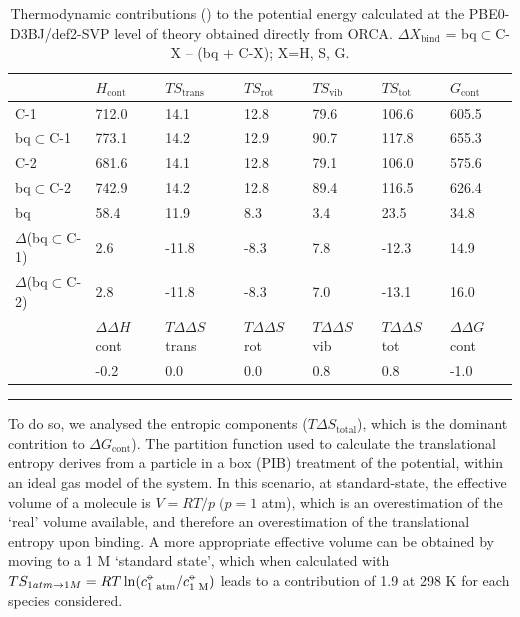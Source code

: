 \documentclass[../../main.tex]{subfiles}
\begin{document}
\begin{table}[h]
	\def\arraystretch{1.7}
	\begin{tabularx}{\textwidth}{YYYYYYY}
		\hline
		&$H_\text{cont}$&	$TS_\text{trans}$	&$TS_\text{rot}	$&$TS_\text{vib}$&	$TS_\text{tot}$&$G_\text{cont}$ 
\\
		\hline
		
		C-1	&712.0	&14.1&	12.8&	79.6&	106.6&	605.5
\\
		bq$\subset$C-1	&773.1&	14.2&	12.9&	90.7	&117.8&	655.3
\\
		C-2	&681.6	&14.1	&12.8&	79.1&	106.0&	575.6
\\
		bq$\subset$C-2	&742.9&	14.2&	12.8&	89.4&	116.5&	626.4
\\
		bq&	58.4&	11.9&	8.3	&3.4&	23.5	&34.8
\\
		$\Delta$(bq$\subset$C-1)&	2.6	&-11.8&	-8.3&	7.8&	-12.3&	14.9
\\
		$\Delta$(bq$\subset$C-2)&	2.8	&-11.8&	-8.3&	7.0	&-13.1&	16.0
\\
		&$\Delta\Delta H$cont&	$T\Delta\Delta S$trans	&$T\Delta\Delta S$rot&	$T\Delta\Delta S$vib&	$T\Delta\Delta S$tot&	$\Delta\Delta G$cont 
\\
     	&	-0.2&	0.0	&0.0&	0.8	&0.8 &	-1.0
\\
		
	\end{tabularx}
	\hrule
	\vspace{0.2cm}
	\caption{Thermodynamic contributions (\kcal) to the potential energy calculated at the PBE0-D3BJ/def2-SVP level of theory obtained directly from ORCA. $\Delta X_\text{bind}$ = bq$\subset$C-X – (bq + C-X); X=H, S, G.}
	\label{table::si_da_5}
\end{table}


To do so, we analysed the entropic components ($T\Delta S_\text{total}$), which is the dominant contrition to $\Delta G_\text{cont}$). The partition function used to calculate the translational entropy derives from a particle in a box (PIB) treatment of the potential, within an ideal gas model of the system. In this scenario, at standard-state, the effective volume of a molecule is $V = RT/p \; (p = 1$ atm), which is an overestimation of the ‘real’ volume available, and therefore an overestimation of the translational entropy upon binding. A more appropriate effective volume can be obtained by moving to a 1 M ‘standard state’,\cite{Ribeiro2011} which when calculated with $TS_{1 atm \rightarrow 1 M} = RT \ln(c^{\circ\kern-0.495em-}_\text{1 atm} / c^{\circ\kern-0.495em-}_\text{1 M})$ leads to a contribution of 1.9 \kcalx at 298 K for each species considered.
\end{document}
